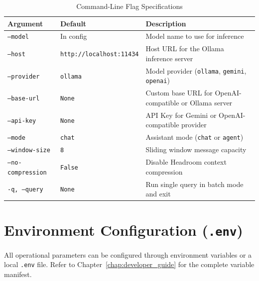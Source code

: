 \begin{table}[htbp]
\centering
\small
\begin{tabular}{lll}
\toprule
\textbf{Argument} & \textbf{Default} & \textbf{Description} \\
\midrule
\texttt{--model} & In config & Model name to use for inference \\
\texttt{--host} & \texttt{http://localhost:11434} & Host URL for the Ollama inference server \\
\texttt{--provider} & \texttt{ollama} & Model provider (\texttt{ollama}, \texttt{gemini}, \texttt{openai}) \\
\texttt{--base-url} & \texttt{None} & Custom base URL for OpenAI-compatible or Ollama server \\
\texttt{--api-key} & \texttt{None} & API Key for Gemini or OpenAI-compatible provider \\
\texttt{--mode} & \texttt{chat} & Assistant mode (\texttt{chat} or \texttt{agent}) \\
\texttt{--window-size} & \texttt{8} & Sliding window message capacity \\
\texttt{--no-compression} & \texttt{False} & Disable Headroom context compression \\
\texttt{-q, --query} & \texttt{None} & Run single query in batch mode and exit \\
\bottomrule
\end{tabular}
\caption{Command-Line Flag Specifications}
\label{tab:cli_flags}
\end{table}

\section{Environment Configuration (\texttt{.env})}
All operational parameters can be configured through environment variables or a local \texttt{.env} file. Refer to Chapter~\ref{chap:developer_guide} for the complete variable manifest.
